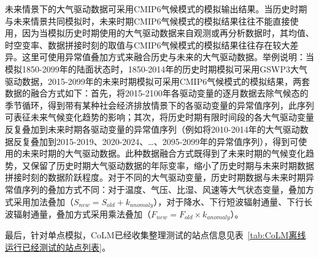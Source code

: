 未来情景下的大气驱动数据可采用CMIP6气候模式的模拟输出结果。当历史时期与未来情景共同模拟时，未来时期CMIP6气候模式的模拟结果往往不能直接使用，因为当模拟历史时期使用的大气驱动数据来自观测或再分析数据时，其均值、时空变率、数据拼接时刻的取值与CMIP6气候模式的模拟结果往往存在较大差异。这里可使用异常值叠加方式来融合历史与未来的大气驱动数据。举例说明：当模拟1850-2099年的陆面状态时，1850-2014年的历史时期模拟可采用GSWP3大气驱动数据，2015-2099年的未来时期模拟可采用CMIP6气候模式的模拟结果，两套数据的融合方式如下：首先，将2015-2100年各驱动变量的逐月数据去除气候态的季节循环，得到带有某种社会经济排放情景下的各驱动变量的异常值序列，此序列可表征未来气候变化趋势的影响；其次，将历史时期有限时间段的各大气驱动变量反复叠加到未来时期各驱动变量的异常值序列（例如将2010-2014年的大气驱动数据反复叠加到2015-2019、2020-2024、…、2095-2099年的异常值序列），得到可使用的未来时期的大气驱动数据。此种数据融合方式既得到了未来时期的气候变化趋势，又保留了历史时期大气驱动数据的年际变率，缩小了历史时期与未来时期数据拼接时刻的数据阶跃程度。对于不同的大气驱动变量，历史时期数据与未来时期异常值序列的叠加方式不同：对于温度、气压、比湿、风速等大气状态变量，叠加方式采用加法叠加（$S_{new}=S_{old}+k_{anomaly}$），对于降水、下行短波辐射通量、下行长波辐射通量，叠加方式采用乘法叠加（$F_{new}=F_{old}\times k_{anomaly}$）。


最后，针对单点模拟，CoLM已经收集整理测试的站点信息见表~\ref{tab:CoLM离线运行已经测试的站点列表}。

